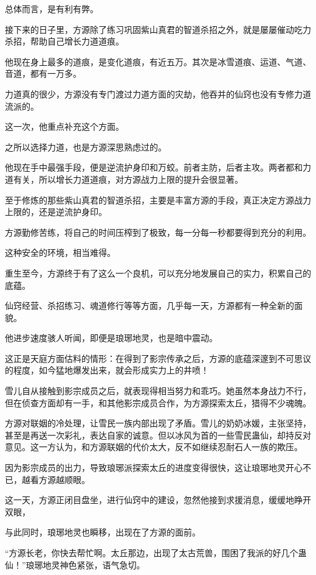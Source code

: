\begin{this_body}
总体而言，是有利有弊。

接下来的日子里，方源除了练习巩固紫山真君的智道杀招之外，就是屡屡催动吃力杀招，帮助自己增长力道道痕。

他现在身上最多的道痕，是变化道痕，有近五万。其次是冰雪道痕、运道、气道、音道，都有一万多。

力道真的很少，方源没有专门渡过力道方面的灾劫，他吞并的仙窍也没有专修力道流派的。

这一次，他重点补充这个方面。

之所以选择力道，也是方源深思熟虑过的。

他现在手中最强手段，便是逆流护身印和万蛟。前者主防，后者主攻。两者都和力道有关，所以增长力道道痕，对方源战力上限的提升会很显著。

至于修炼的那些紫山真君的智道杀招，主要是丰富方源的手段，真正决定方源战力上限的，还是逆流护身印。

方源勤修苦练，将自己的时间压榨到了极致，每一分每一秒都要得到充分的利用。

这种安全的环境，相当难得。

重生至今，方源终于有了这么一个良机，可以充分地发展自己的实力，积累自己的底蕴。

仙窍经营、杀招练习、魂道修行等等方面，几乎每一天，方源都有一种全新的面貌。

他进步速度骇人听闻，即便是琅琊地灵，也是暗中震动。

这正是天庭方面估料的情形：在得到了影宗传承之后，方源的底蕴深邃到不可思议的程度，如今猛地爆发出来，就会形成实力上的井喷！

雪儿自从接触到影宗成员之后，就表现得相当努力和乖巧。她虽然本身战力不行，但在侦查方面却有一手，和其他影宗成员合作，为方源探索太丘，猎得不少魂魄。

方源对联姻的冷处理，让雪民一族内部出现了矛盾。雪儿的奶奶冰媛，主张坚持，甚至是再送一次彩礼，表达自家的诚意。但以冰风为首的一些雪民蛊仙，却持反对意见。这一方认为，和方源联姻的代价太大，反不如继续忍耐石人一族的欺压。

因为影宗成员的出力，导致琅琊派探索太丘的进度变得很快，这让琅琊地灵开心不已，越看方源越顺眼。

这一天，方源正闭目盘坐，进行仙窍中的建设，忽然他接到求援消息，缓缓地睁开双眼，

与此同时，琅琊地灵也瞬移，出现在了方源的面前。

“方源长老，你快去帮忙啊。太丘那边，出现了太古荒兽，围困了我派的好几个蛊仙！”琅琊地灵神色紧张，语气急切。

\end{this_body}

